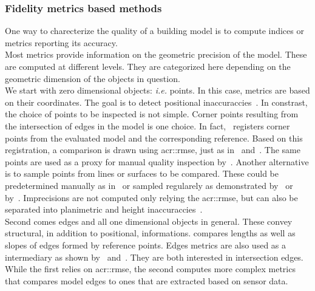         \subsubsection{Fidelity metrics based methods}
            One way to charecterize the quality of a building model is to compute indices or metrics reporting its accuracy.\\

            Most metrics provide information on the geometric precision of the model.
            These are computed at different levels.
            They are categorized here depending on the geometric dimension of the objects in question.\\
            We start with zero dimensional objects: \textit{i.e.} points.
            In this case, metrics are based on their coordinates.
            The goal is to detect positional inaccuraccies~\parencite{kaartinen2005accuracy}.
            In constrast, the choice of points to be inspected is not simple.
            Corner points resulting from the intersection of edges in the model is one choice.
            In fact,~\textcite{zeng2014multicriteria} registers corner points from the evaluated model and the corresponding reference.
            Based on this registration, a comparison is drawn using \gls{acr::rmse}, just as in~\parencite{landes2012quality} and~\parencite{you2011quality}.
            The same points are used as a proxy for manual quality inspection by~\textcite{elberink2011quality}.
            Another alternative is to sample points from lines or surfaces to be compared.
            These could be predetermined manually as in~\textcite{kaartinen2005accuracy} or sampled regularely as demonstrated by~\textcite{vogtle2003quality} or by~\textcite{tran2019geometric}.
            Imprecisions are not computed only relying the \gls{acr::rmse}, but can also be separated into planimetric and height inaccuraccies~\parencite{vogtle2003quality, kaartinen2005accuracy, jaynes2003recognition}.\\
            Second comes edges and all one dimensional objects in general.
            These convey structural, in addition to positional, informations.
            \textcite{kaartinen2005accuracy} compares lengths as well as slopes of edges formed by reference points.
            Edges metrics are also used as a intermediary as shown by~\textcite{elberink2011quality} and~\textcite{michelin2013quality}.
            They are both interested in intersection edges.
            While the first relies on \gls{acr::rmse}, the second computes more complex metrics that compares model edges to ones that are extracted based on sensor data.\\
